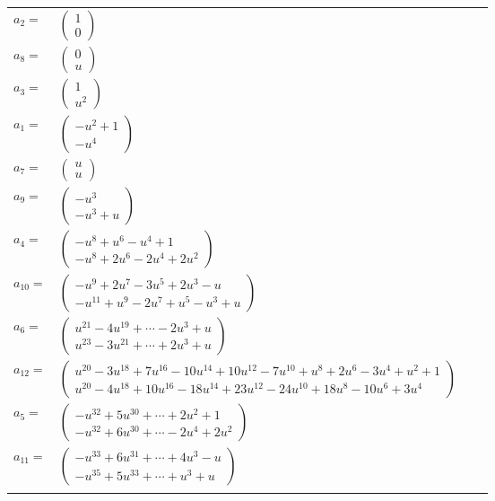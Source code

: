 \documentclass[1p]{elsarticle_modified}
\theoremstyle{definition}
\begin{document}
\begin{tabular}{m{7pt} m{180pt} m{7pt} m{180pt} }
\flushright $a_{2}=$&$\begin{pmatrix}1\\0\end{pmatrix}$ \\
\flushright $a_{8}=$&$\begin{pmatrix}0\\u\end{pmatrix}$ \\
\flushright $a_{3}=$&$\begin{pmatrix}1\\u^2\end{pmatrix}$ \\
\flushright $a_{1}=$&$\begin{pmatrix}- u^2+1\\- u^4\end{pmatrix}$ \\
\flushright $a_{7}=$&$\begin{pmatrix}u\\u\end{pmatrix}$ \\
\flushright $a_{9}=$&$\begin{pmatrix}- u^3\\- u^3+u\end{pmatrix}$ \\
\flushright $a_{4}=$&$\begin{pmatrix}- u^8+u^6- u^4+1\\- u^8+2 u^6-2 u^4+2 u^2\end{pmatrix}$ \\
\flushright $a_{10}=$&$\begin{pmatrix}- u^9+2 u^7-3 u^5+2 u^3- u\\- u^{11}+u^9-2 u^7+u^5- u^3+u\end{pmatrix}$ \\
\flushright $a_{6}=$&$\begin{pmatrix}u^{21}-4 u^{19}+\cdots-2 u^3+u\\u^{23}-3 u^{21}+\cdots+2 u^3+u\end{pmatrix}$ \\
\flushright $a_{12}=$&$\begin{pmatrix}u^{20}-3 u^{18}+7 u^{16}-10 u^{14}+10 u^{12}-7 u^{10}+u^8+2 u^6-3 u^4+u^2+1\\u^{20}-4 u^{18}+10 u^{16}-18 u^{14}+23 u^{12}-24 u^{10}+18 u^8-10 u^6+3 u^4\end{pmatrix}$ \\
\flushright $a_{5}=$&$\begin{pmatrix}- u^{32}+5 u^{30}+\cdots+2 u^2+1\\- u^{32}+6 u^{30}+\cdots-2 u^4+2 u^2\end{pmatrix}$ \\
\flushright $a_{11}=$&$\begin{pmatrix}- u^{33}+6 u^{31}+\cdots+4 u^3- u\\- u^{35}+5 u^{33}+\cdots+u^3+u\end{pmatrix}$\\&\end{tabular}
\end{document}
